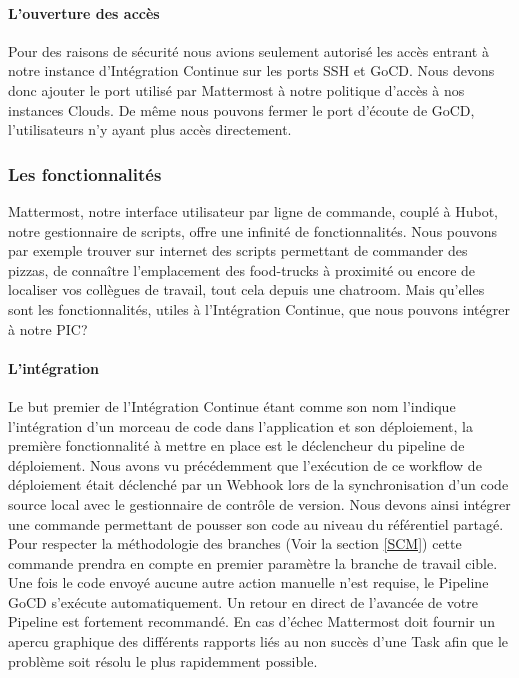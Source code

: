           \paragraph{L'ouverture des accès}
          Pour des raisons de sécurité nous avions seulement autorisé les accès entrant à notre instance d'Intégration Continue sur les ports SSH et GoCD. Nous devons donc ajouter le port utilisé par Mattermost à notre politique d'accès à nos instances Clouds. De même nous pouvons fermer le port d'écoute de GoCD, l'utilisateurs n'y ayant plus accès directement.

        \subsubsection{Les fonctionnalités}
        Mattermost, notre interface utilisateur par ligne de commande, couplé à Hubot, notre gestionnaire de scripts, offre une infinité de fonctionnalités. Nous pouvons par exemple trouver sur internet des scripts permettant de commander des pizzas, de connaître l'emplacement des food-trucks à proximité ou encore de localiser vos collègues de travail, tout cela depuis une chatroom. Mais qu'elles sont les fonctionnalités, utiles à l'Intégration Continue, que nous pouvons intégrer à notre PIC?

          \paragraph{L'intégration} Le but premier de l'Intégration Continue étant comme son nom l'indique l'intégration d'un morceau de code dans l'application et son déploiement, la première fonctionnalité à mettre en place est le déclencheur du pipeline de déploiement. Nous avons vu précédemment que l'exécution de ce workflow de déploiement était déclenché par un Webhook lors de la synchronisation d'un code source local avec le gestionnaire de contrôle de version. Nous devons ainsi intégrer une commande permettant de pousser son code au niveau du référentiel partagé. Pour respecter la méthodologie des branches (Voir la section \ref{SCM}) cette commande prendra en compte en premier paramètre la branche de travail cible. Une fois le code envoyé aucune autre action manuelle n'est requise, le Pipeline GoCD s'exécute automatiquement. Un retour en direct de l'avancée de votre Pipeline est fortement recommandé. En cas d'échec Mattermost doit fournir un apercu graphique des différents rapports liés au non succès d'une Task afin que le problème soit résolu le plus rapidemment possible.

